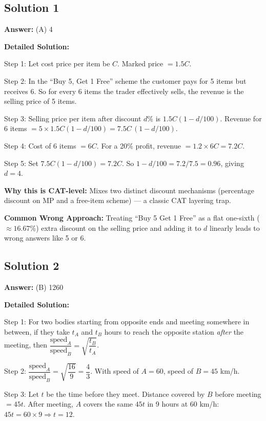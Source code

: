 \documentclass[11pt]{article}
\begin{document}
\subsection*{Solution 1}
\textbf{Answer:} (A) 4

\textbf{Detailed Solution:}

Step 1: Let cost price per item be \(C\). Marked price \( = 1.5C\).

Step 2: In the ``Buy 5, Get 1 Free'' scheme the customer pays for 5 items but receives 6. So for every 6 items the trader effectively sells, the revenue is the selling price of 5 items.

Step 3: Selling price per item after discount \(d\%\) is \(1.5C(1 - d/100)\). Revenue for 6 items \(= 5 \times 1.5C(1 - d/100) = 7.5C\,(1 - d/100)\).

Step 4: Cost of 6 items \(= 6C\). For a 20\% profit, revenue \(= 1.2 \times 6C = 7.2C\).

Step 5: Set \(7.5C(1-d/100) = 7.2C\). So \(1 - d/100 = 7.2/7.5 = 0.96\), giving \(d = 4\).

\textbf{Why this is CAT-level:} Mixes two distinct discount mechanisms (percentage discount on MP and a free-item scheme) — a classic CAT layering trap.

\textbf{Common Wrong Approach:} Treating ``Buy 5 Get 1 Free'' as a flat one-sixth (\(\approx 16.67\%\)) extra discount on the selling price and adding it to \(d\) linearly leads to wrong answers like 5 or 6.

\subsection*{Solution 2}
\textbf{Answer:} (B) 1260

\textbf{Detailed Solution:}

Step 1: For two bodies starting from opposite ends and meeting somewhere in between, if they take \(t_A\) and \(t_B\) hours to reach the opposite station \emph{after} the meeting, then \(\dfrac{\text{speed}_A}{\text{speed}_B} = \sqrt{\dfrac{t_B}{t_A}}\).

Step 2: \(\dfrac{\text{speed}_A}{\text{speed}_B} = \sqrt{\dfrac{16}{9}} = \dfrac{4}{3}\). With speed of \(A = 60\), speed of \(B = 45\) km/h.

Step 3: Let \(t\) be the time before they meet. Distance covered by \(B\) before meeting \(= 45t\). After meeting, \(A\) covers the same \(45t\) in 9 hours at 60 km/h: \(45t = 60 \times 9 \Rightarrow t = 12\).
\end{document}
